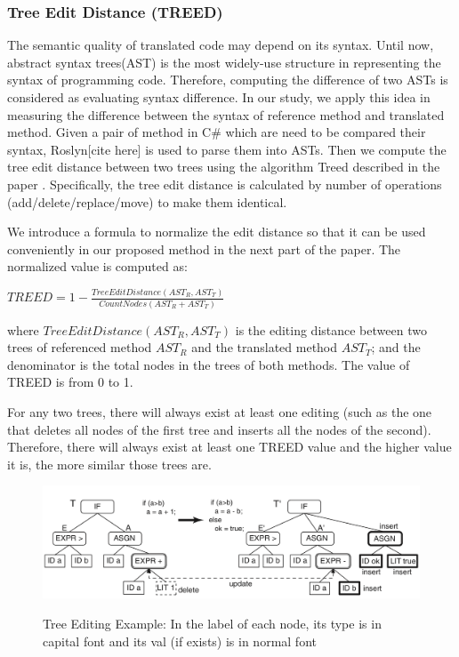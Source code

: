\subsubsection{\textbf{Tree Edit Distance (TREED)}}  
The semantic quality of translated code may depend on its syntax. Until now, abstract syntax trees(AST) is the most widely-use structure in representing the syntax of programming code. Therefore, computing the difference of two ASTs is considered as evaluating syntax difference.
In our study, we apply this idea in measuring the difference between the syntax of reference method and translated method. Given a pair of method in C\# which are need to be compared their syntax, Roslyn[cite here] is used to parse them into ASTs. Then we compute the tree edit distance between two trees using the algorithm Treed described in the paper \cite{algorithm}.
Specifically, the tree edit distance is calculated by number of operations (add/delete/replace/move) to make them identical. 

We introduce a formula to normalize the edit distance so that it can be used conveniently in our proposed method in the next part of the paper. The normalized value is computed as:

  $TREED = 1 -  \frac{TreeEditDistance\left(AST_R, AST_T\right)}{CountNodes \left(AST_R+AST_T\right)}$ 
  
where $TreeEditDistance\left(AST_R, AST_T\right)$ is the editing distance between two trees of referenced method $AST_R$ and the translated method $AST_T$; and the denominator is the total nodes in the trees of both methods. The value of TREED is from 0 to 1. 

For any two trees, there will always exist at least one editing (such as the one that deletes all nodes of the first tree and inserts all the nodes of the second). Therefore, there will always exist at least one TREED value and the higher value it is, the more similar those trees are.

\begin{figure}[h]
	\caption{Tree Editing Example: In the label of each node, its type is in capital font and its val (if exists) is in normal font}
	\includegraphics[scale=0.3]{img/treed.png}
	\centering
	\label{fig:treed}
\end{figure}

